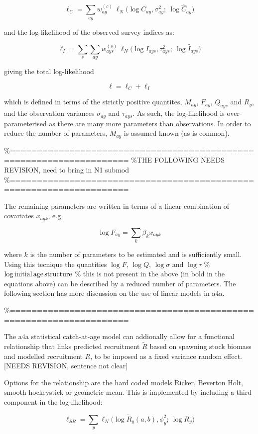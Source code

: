 \documentclass[
]{book}
\begin{document}
\[  \ell_C = \sum_{ay} w^{(c)}_{ay}\ \ell_N \Big( \log C_{ay}, \sigma^2_{ay} ;\ \log \hat{C}_{ay} \Big) \]

and the log-likelihood of the observed survey indices as:

\[  \ell_I = \sum_s \sum_{ay} w^{(s)}_{ays}\ \ell_N \Big( \log I_{ays}, \tau_{ays}^2 ;\ \log \hat{I}_{ays} \Big)\]

giving the total log-likelihood

\[\ell = \ell_C + \ell_I\]

which is defined in terms of the strictly positive quantites, \(M_{ay}\), \(F_{ay}\), \(Q_{ays}\) and \(R_{y}\), and the observation variances \(\sigma_{ay}\) and \(\tau_{ays}\). As such, the log-likelihood is over-parameterised as there are many more parameters than observations. In order to reduce the number of parameters, \(M_{ay}\) is assumed known (as is common).

\%====================================================================
\%THE FOLLOWING NEEDS REVISION, need to bring in N1 submod
\%====================================================================

The remaining parameters are written in terms of a linear combination of covariates \(x_{ayk}\), e.g.

\[\log F_{ay} = \sum_k \beta_k x_{ayk}\]

where \(k\) is the number of parameters to be estimated and is sufficiently small. Using this tecnique the quantities \(\log F\), \(\log Q\), \(\log \sigma\) and \(\log \tau\)
\%\(\log \text{initial\,age\,structure}\) \% this is not present in the above
(in bold in the equations above) can be described by a reduced number of parameters. The following section has more discussion on the use of linear models in a4a.

\%====================================================================

The a4a statistical catch-at-age model can addionally allow for a functional relationship that links predicted recruitment \(\tilde{R}\) based on spawning stock biomass and modelled recruitment \(R\), to be imposed as a fixed variance random effect. {[}NEEDS REVISION, sentence not clear{]}

Options for the relationship are the hard coded models Ricker, Beverton Holt, smooth hockeystick or geometric mean. This is implemented by including a third component in the log-likelihood:

\[\ell_{SR} = \sum_y \ell_N \Big( \log \tilde{R}_y(a, b), \phi_y^2 ;\ \log R_y \Big)\]
\end{document}
